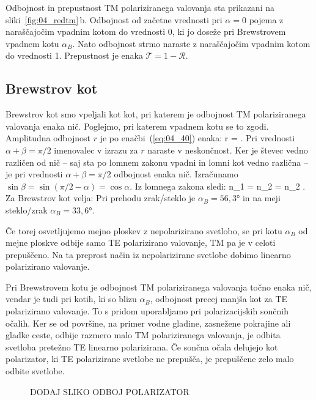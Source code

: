 Odbojnost in prepustnost TM polariziranega valovanja sta prikazani na 
sliki~\ref{fig:04_redtm}\,b. Odbojnost od začetne vrednosti pri $\alpha=0$
pojema z naraščajočim vpadnim kotom do vrednosti 0, ki jo doseže pri 
Brewstrovem vpadnem kotu $\alpha_B$. Nato odbojnost strmo naraste z naraščajočim vpadnim
kotom do vrednosti 1. Prepustnost je enaka $\mathcal{T} = 1- \mathcal{R}$.

\subsection*{Brewstrov kot}
Brewstrov kot smo vpeljali kot kot, pri katerem je odbojnost
TM polariziranega valovanja enaka nič. Poglejmo, pri katerem
vpadnem kotu se to zgodi. Amplitudna odbojnost $r$ je po enačbi~(\ref{eq:04_40})
enaka:
\beq
r = \frac{\tan(\alpha-\beta)}{\tan(\alpha+\beta)}.
\label{eq:04_50}
\eeq
Pri vrednosti $\alpha + \beta = \pi/2$ imenovalec v izrazu za $r$ 
naraste v neskončnost. Ker je števec vedno različen od nič -- saj
sta po lomnem zakonu vpadni in lomni kot vedno različna -- je pri 
vrednosti $\alpha + \beta = \pi/2$ odbojnost enaka nič.
Izračunamo $\sin \beta = \sin (\pi/2-\alpha) = \cos \alpha$. 
Iz lomnega zakona sledi:
\beq
n_1 \sin \alpha= n_2 \sin \beta= n_2 \cos \alpha.
\label{eq:04_51}
\eeq
Za Brewstrov kot velja:
Pri prehodu zrak/steklo je $\alpha_B = 56,3\si{\degree}$ in na meji
steklo/zrak $\alpha_B = 33,6\si{\degree}$. 

Če torej osvetljujemo mejno ploskev z nepolarizirano svetlobo, se 
pri kotu $\alpha_B$ od mejne ploskve odbije samo TE polarizirano
valovanje, TM pa je v celoti prepuščeno. Na ta preprost način
iz nepolarizirane svetlobe dobimo linearno polarizirano valovanje. 

\begin{remark}
Pri Brewstrovem kotu je odbojnost TM polariziranega valovanja točno 
enaka nič, vendar je tudi pri kotih, ki so blizu $\alpha_B$, 
odbojnost precej manjša kot za TE polarizirano valovanje. 
To s pridom uporabljamo pri polarizacijskih sončnih očalih. Ker
se od površine, na primer vodne gladine, zasnežene pokrajine
ali gladke ceste, odbije razmero malo TM polariziranega valovanja, 
je odbita svetloba pretežno TE linearno polarizirana. Če sončna
očala delujejo kot polarizator, ki TE polarizirane svetlobe
ne prepušča, je prepuščene zelo malo odbite svetlobe.
\end{remark}
\begin{figure}[ht]
\centering
\caption{DODAJ SLIKO ODBOJ POLARIZATOR}
\label{fig:04_PolarizacijaFoto}
\end{figure}

